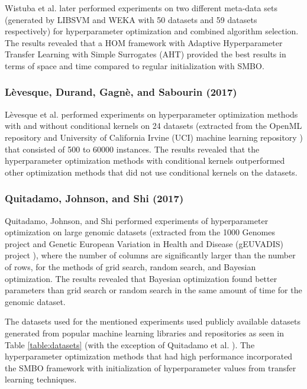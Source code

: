 Wistuba et al. \cite{Wistuba:2016} later performed experiments on two different meta-data sets (generated by LIBSVM \cite{Chang:2011} and WEKA \cite{Hall:2009} with 50 datasets and 59 datasets respectively) for hyperparameter optimization and combined algorithm selection. The results revealed that a HOM framework with Adaptive Hyperparameter Transfer Learning with Simple Surrogates (AHT) provided the best results in terms of space and time compared to regular initialization with SMBO.

\subsubsection{L\`evesque, Durand, Gagn\`e, and Sabourin (2017)} \label{levesque-2017}

L\`evesque et al. \cite{Levesque:2017} performed experiments on hyperparameter optimization methods with and without conditional kernels on 24 datasets (extracted from the OpenML repository \cite{Vanschoren:2014} and University of California Irvine (UCI) machine learning repository \cite{Lichman:2013}) that consisted of 500 to 60000 instances. The results revealed that the hyperparameter optimization methods with conditional kernels outperformed other optimization methods that did not use conditional kernels on the datasets.

\subsubsection{Quitadamo, Johnson, and Shi (2017)} \label{quitadamo-2017}

Quitadamo, Johnson, and Shi \cite{Quitadamo:2017} performed experiments of hyperparameter optimization on large genomic datasets (extracted from the 1000 Genomes project \cite{Sudmant:2015} and Genetic European Variation in Health and Disease (gEUVADIS) project \cite{Lappalainen:2013}), where the number of columns are significantly larger than the number of rows, for the methods of grid search, random search, and Bayesian optimization. The results revealed that Bayesian optimization found better parameters than grid search or random search in  the same amount of time for the genomic dataset.

The datasets used for the mentioned experiments used publicly available datasets generated from popular machine learning libraries and repositories as seen in Table \ref{table:datasets} (with the exception of Quitadamo et al. \cite{Quitadamo:2017}). The hyperparameter optimization methods that had high performance incorporated the SMBO framework with initialization of hyperparameter values from transfer learning techniques.

